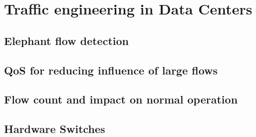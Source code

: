 \chapter{Traffic engineering in Data Centers} \label{chap:me} %

\section {Elephant flow detection}
\section {QoS for reducing influence of large flows}
\section {Flow count and impact on normal operation}
\section {Hardware Switches}
